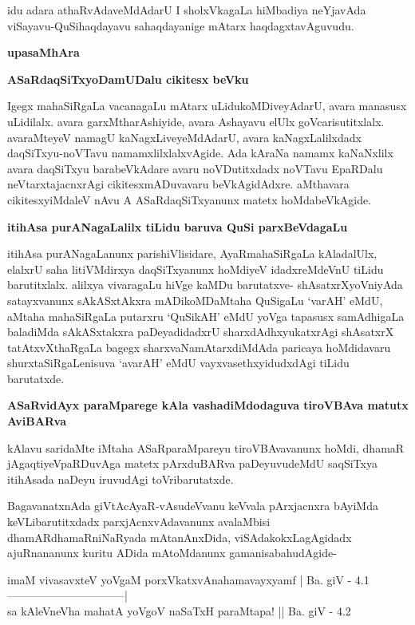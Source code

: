 idu adara athaRvAdaveMdAdarU I sholxVkagaLa hiMbadiya neYja\-vAda viSayavu-QuSihaqdayavu sahaqdayanige mAtarx haqdagxtavAguvudu.

\newpage

\begin{center}
{\Large{\textbf{upasaMhAra}}}
\end{center}
{
\noindent
{\large\bf ASaRdaqSiTxyoDamUDalu cikitesx beVku}}\label{page61}
\medskip

\noindent
Igegx mahaSiRgaLa vacanagaLu mAtarx uLidukoMDiveyAdarU, avara \hbox{manasusx} uLidilalx. avara garxMtha\-rAshiyide, avara Ashayavu elUlx goVcarisutitxlalx. ava\-raMteyeV namagU kaNagxLiveyeMdAdarU, avara kaNagxLalilxdadx daqSiTxyu-noVTavu namamxlilxlalxvAgide. Ada kAraNa namamx kaNaNxlilx avara daqSiTxyu barabeVkAdare avaru noVDutitxdadx noVTavu EpaRDalu neVtarxtajacnxrAgi cikitesxmADuvavaru beVkAgidAdxre. aMthavara cikitesxyiMdaleV nAvu A ASaRdaqSiTxyanunx matetx hoMdabeVkAgide.

{\bigskip
\noindent
{\large\bf itihAsa purANagaLalilx tiLidu baruva QuSi parxBeVdagaLu}}\label{page62}
\medskip

\noindent
itihAsa purANagaLanunx parishiVlisidare, AyaRmahaSiRgaLa kAladalUlx, elalxrU saha litiVMdirxya daqSiTxyanunx hoMdiyeV idadxreMdeVnU tiLidu barutitxlalx. alilxya vivaragaLu hiVge kaMDu baru\-tatxve- shAsatxrXyoVniyAda satayxvanunx sAkASxtAkxra mADikoMDaMtaha QuSigaLu `varAH' eMdU, aMtaha maha\-SiRgaLa putarxru `QuSikAH' eMdU yoVga tapasusx samAdhigaLa baladiMda sAkASxtakxra paDeya\-didadxrU sharxdAdhx\-yukatxrAgi shAsatxrX tatAtxvXthaRgaLa bagegx sharxvaNamAtarxdiMdAda paricaya hoMdidavaru shurxta\-SiR\-gaLenisuva `avarAH' eMdU vayxvasethxyidudxdAgi tiLidu barutatxde.

{\bigskip
\noindent
{\large\bf ASaRvidAyx paraMparege kAla vashadiMdodaguva tiroVBAva matutx AviBARva}}\label{page92}
\medskip

\noindent
kAlavu saridaMte iMtaha ASaRparaMpareyu tiroVBAvavanunx hoMdi, dhamaR jAgaqtiyeVpaRDu\-vAga matetx pArxduBARva paDeyuvudeMdU saqSiTxya itihAsada naDeyu iruvudAgi toVribarutatxde.

BagavanatxnAda giVtAcAyaR-vAsudeVvanu keVvala pArxjacnxra bAyiMda keVLibarutitxdadx parxjAcnxvAda\-vanunx avalaMbisi dhamARdhamaRniNaRyada mAtanAnxDida, viSAda\-kokxLagAgidadx ajuRnananunx kuritu ADida mAtoMdanunx gamanisabahudAgide-

\begin{shloka}
imaM vivasavxteV yoVgaM porxVkatxvAnahamavayxyamf | Ba. giV - 4.1\\\label{62} 
--------------------------------|\\
sa kAleVneVha mahatA yoVgoV naSaTxH paraMtapa! || Ba. giV - 4.2
\end{shloka}

